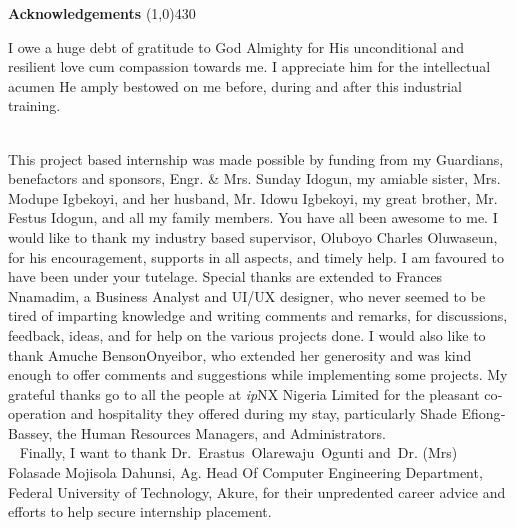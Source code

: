 \begin{center}
{\huge \bf Acknowledgements}
\line(1,0){430}
\end{center}



I owe a huge debt of gratitude to God Almighty for His unconditional and resilient love cum compassion towards me. I appreciate him for the intellectual acumen He amply bestowed on me before, during and after this industrial training.\\ 

This project based internship was made possible by funding from my Guardians, benefactors and sponsors, Engr. \& Mrs. Sunday Idogun, my amiable sister, Mrs. Modupe Igbekoyi, and her husband, Mr. Idowu Igbekoyi, my great brother, Mr. Festus Idogun, and all my family members. You have all been awesome to me. I would like to thank my industry ­based supervisor, Oluboyo Charles Oluwaseun, for his encouragement, supports in all aspects, and timely help. I am favoured to have been under your tutelage. Special thanks are extended to Frances Nnamadim, a Business Analyst and \ac{UI}/\ac{UX} designer, who never seemed to be tired of imparting knowledge and writing comments and remarks, for discussions, feedback, ideas, and for help on the various projects done. I would also like to thank Amuche Benson­Onyeibor, who extended her generosity and was kind enough to offer comments and suggestions while implementing some projects. My grateful thanks go to all the people at \textit{ip}NX Nigeria Limited for the pleasant co­operation and hospitality they offered during my stay, particularly Shade Efiong­Bassey, the Human Resources Managers, and Administrators.\\

 
Finally, I want to thank Dr. Erastus Olarewaju Ogunti and Dr. (Mrs) Folasade Mojisola Dahunsi, Ag. Head Of Computer Engineering Department, Federal University of Technology, Akure, for their unpredented career advice and efforts to help secure internship placement.

\clearpage